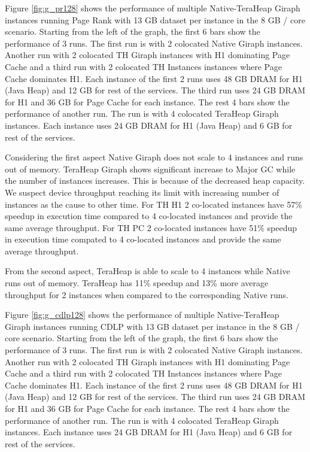 Figure \ref{fig:g_pr128} shows the performance of multiple
Native-TeraHeap Giraph instances running Page Rank with 13 GB
dataset per instance in the 8 GB / core scenario.
Starting from the left of the graph, the first 6 bars show the
performance of 3 runs. The first run is with 2 colocated Native Giraph instances.
Another run with 2 colocated TH Giraph instances with H1 dominating Page Cache
and a third run with 2 colocated TH Instances instances where Page Cache dominates H1.
Each instance of the first 2 runs uses 48 GB DRAM for H1 (Java Heap) and 12 GB for rest of the services.
The third run uses 24 GB DRAM for H1 and 36 GB for Page Cache for each instance.
The rest 4 bars show the performance of another run. The run is with 4 colocated TeraHeap Giraph instances.
Each instance uses 24 GB DRAM for H1 (Java Heap) and 6 GB for rest of the services.

Considering the first aspect Native Giraph does not scale to 4 instances and runs out of memory. TeraHeap Giraph shows significant increase to Major GC while the number of instances increases. This is because of the decreased heap capacity. We suspect device throughput reaching its limit with increasing number of instances as the cause to other time. For TH H1 2 co-located instances have 57\% speedup in execution time compared to 4 co-located instances and provide the same average throughput. For TH PC 2 co-located instances have 51\% speedup in execution time compated to 4 co-located instances and provide the same average throughput.

From the second aspect, TeraHeap is able to scale to 4 instances while Native runs out of memory. TeraHeap has 11\% speedup and 13\% more average throughput for 2 instances when compared to the corresponding Native runs.

Figure \ref{fig:g_cdlp128} shows the performance of multiple
Native-TeraHeap Giraph instances running CDLP with 13 GB
dataset per instance in the 8 GB / core scenario.
Starting from the left of the graph, the first 6 bars show the
performance of 3 runs. The first run is with 2 colocated Native Giraph instances.
Another run with 2 colocated TH Giraph instances with H1 dominating Page Cache
and a third run with 2 colocated TH Instances instances where Page Cache dominates H1.
Each instance of the first 2 runs uses 48 GB DRAM for H1 (Java Heap) and 12 GB for rest of the services.
The third run uses 24 GB DRAM for H1 and 36 GB for Page Cache for each instance.
The rest 4 bars show the performance of another run. The run is with 4 colocated TeraHeap Giraph instances.
Each instance uses 24 GB DRAM for H1 (Java Heap) and 6 GB for rest of the services.

